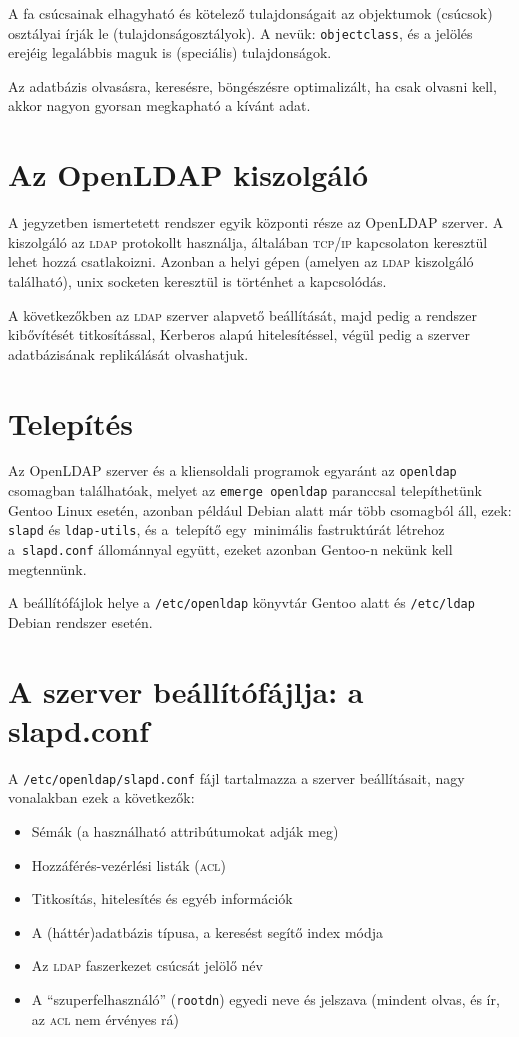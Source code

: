 A fa csúcsainak elhagyható és kötelező tulajdonságait az objektumok (csúcsok) osztályai írják le
(tulajdonságosztályok). A nevük: \texttt{objectclass}, és a jelölés erejéig legalábbis  maguk is (speciális)
tulajdonságok.

Az adatbázis olvasásra, keresésre, böngészésre optimalizált, ha csak olvasni kell, akkor nagyon gyorsan megkapható a
kívánt adat.

\section{Az OpenLDAP kiszolgáló}

A jegyzetben ismertetett rendszer egyik központi része az OpenLDAP szerver. A kiszolgáló az \textsc{ldap} protokollt
használja, általában \textsc{tcp}/\textsc{ip} kapcsolaton keresztül lehet hozzá csatlakoizni. Azonban a helyi gépen
(amelyen az \textsc{ldap} kiszolgáló található), unix socketen keresztül is történhet a kapcsolódás.

A következőkben az \textsc{ldap} szerver alapvető beállítását, majd pedig a rendszer kibővítését titkosítással,
Kerberos alapú hitelesítéssel, végül pedig a szerver adatbázisának replikálását olvashatjuk.


\section{Telepítés}
Az OpenLDAP szerver és a kliensoldali programok egyaránt az \texttt{openldap} csomagban találhatóak, melyet az
\texttt{emerge openldap} paranccsal telepíthetünk Gentoo Linux esetén, azonban például Debian alatt már több csomagból
áll, ezek: \texttt{slapd} és \texttt{ldap-utils}, és a~telepítő egy~minimális fastruktúrát létrehoz a~\texttt{slapd.conf}
állománnyal együtt, ezeket azonban Gentoo-n nekünk kell megtennünk.

A beállítófájlok helye a \texttt{/etc/openldap} könyvtár Gentoo alatt és \texttt{/etc/ldap} Debian rendszer esetén.

\section{A szerver beállítófájlja: a slapd.conf}
A \texttt{/etc/openldap/slapd.conf} fájl tartalmazza a szerver beállításait, nagy vonalakban ezek a következők:

\begin{itemize}
\item Sémák (a használható attribútumokat adják meg)
\item Hozzáférés-vezérlési listák (\textsc{acl})
\item Titkosítás, hitelesítés és egyéb információk
\item A (háttér)adatbázis típusa, a keresést segítő index módja
\item Az \textsc{ldap} faszerkezet csúcsát jelölő név
\item A ``szuperfelhasználó'' (\texttt{rootdn}) egyedi neve és jelszava (mindent olvas, és ír, az \textsc{acl} nem érvényes rá)
\end{itemize}  

